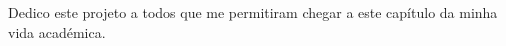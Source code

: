 

\frontmatter %

\pagestyle{plain} %




\integritystatement

%
\begin{dedicatory}
Dedico este projeto a todos que me permitiram chegar a este capítulo da minha vida académica.
\end{dedicatory}


